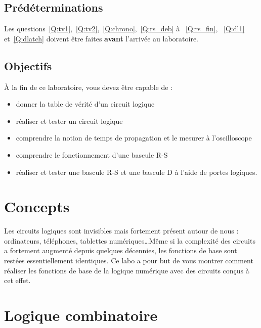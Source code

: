 \documentclass[11pt,a4paper]{article}
\theoremstyle{definition}%
\newtheorem{Q}{Question}[] %
\newcommand{\reponse}[1]{%
	\ifthenelse {\boolean{corrige}} {\paragraph{Réponse :} \color{darkblue}   #1\color{black}} {}
 }
\begin{document}

\subsection{Prédéterminations}
Les questions~\ref{Q:tv1},~\ref{Q:tv2},~\ref{Q:chrono},~\ref{Q:rs_deb} à ~\ref{Q:rs_fin}, ~\ref{Q:dl1} et~\ref{Q:dlatch} doivent être faites \textbf{avant} l'arrivée au laboratoire.



\subsection{Objectifs}
À la fin de ce laboratoire, vous devez être capable de :
\begin{itemize}
\item donner la table de vérité d'un circuit logique
\item réaliser et tester un circuit logique
\item comprendre la notion de temps de propagation et le mesurer à l'oscilloscope
\item comprendre le fonctionnement d'une bascule R-S
\item réaliser et tester une bascule R-S et une bascule D à l'aide de portes logiques.
\end{itemize}
\newpage
\pagestyle{fancy}

\section{Concepts}

Les circuits logiques sont invisibles mais fortement présent autour de nous : ordinateurs, téléphones, tablettes numériques\dots Même si la complexité des circuits a fortement augmenté depuis quelques décennies, les fonctions de base sont restées essentiellement identiques. Ce labo a pour but de vous montrer comment réaliser les fonctions de base de la logique numérique avec des circuits conçus à cet effet.

\section{Logique combinatoire}
\end{document}
